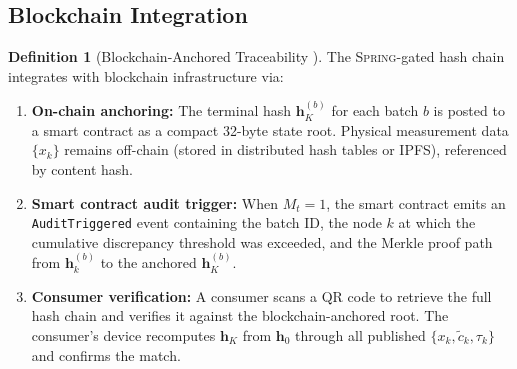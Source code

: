 \documentclass[11pt,a4paper]{article}
\theoremstyle{definition}
\newtheorem{definition}[theorem]{Definition}
\theoremstyle{remark}
\newcommand{\Spring}{\textsc{Spring}}
\newcommand{\hashChain}{\mathbf{h}}
\begin{document}
\subsection{Blockchain Integration }

\begin{definition}[Blockchain-Anchored Traceability ]
\label{def:blockchain}
The \Spring{}-gated hash chain integrates with blockchain infrastructure via:
\begin{enumerate}[label=(\roman*)]
    \item \textbf{On-chain anchoring:} The terminal hash $\hashChain_K^{(b)}$ for each batch $b$ is posted to a smart contract as a compact 32-byte state root. Physical measurement data $\{x_k\}$ remains off-chain (stored in distributed hash tables or IPFS), referenced by content hash.
    \item \textbf{Smart contract audit trigger:} When $M_t = 1$, the smart contract emits an \texttt{AuditTriggered} event containing the batch ID, the node $k$ at which the cumulative discrepancy threshold was exceeded, and the Merkle proof path from $\hashChain_k^{(b)}$ to the anchored $\hashChain_K^{(b)}$.
    \item \textbf{Consumer verification:} A consumer scans a QR code to retrieve the full hash chain and verifies it against the blockchain-anchored root. The consumer's device recomputes $\hashChain_K$ from $\hashChain_0$ through all published $\{x_k, \tilde{c}_k, \tau_k\}$ and confirms the match.
\end{enumerate}
\end{definition}
\end{document}
